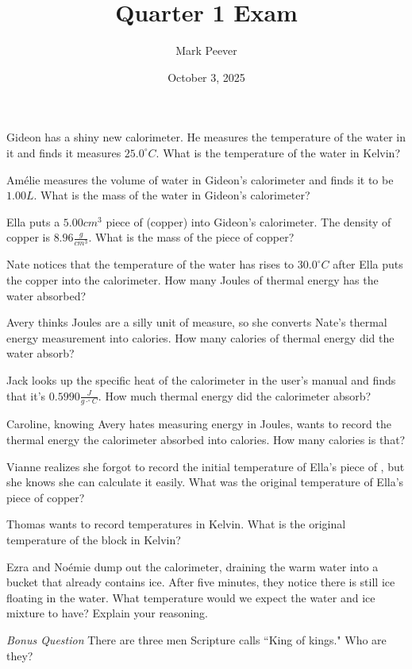 \documentclass[11pt,addpoints]{exam}   	%
\title{Quarter 1 Exam}
\author{Mark Peever}
\date{October 3, 2025}							%
\begin{document}
\maketitle

\pointsinrightmargin

\begin{center}
\end{center}
\vspace{0.1in}
\vspace{0.2in}

\begin{questions}
\question[5] Gideon has a shiny new calorimeter. He measures the temperature of the water in it and finds it measures  $25.0^{\circ}C$. What is the temperature of the water in Kelvin? 

\question[5] Am\'{e}lie measures the volume of water in Gideon's calorimeter and finds it to be $1.00 L$. What is the mass of the water in Gideon's calorimeter?

\question[5] Ella puts a $5.00 cm^3$ piece of  (copper) into Gideon's calorimeter.  The density of copper is $8.96 \frac{g}{cm^{3}}$. What is the mass of the piece of copper?

\question[5] Nate notices that the temperature of the water has rises to $30.0^{\circ}C$ after Ella puts the copper into the calorimeter. How many Joules of thermal energy has the water absorbed?

\question[5] Avery thinks Joules are a silly unit of measure, so she converts Nate's thermal energy measurement into calories. How many calories of thermal energy did the water absorb?

\question[5] Jack looks up the specific heat of the calorimeter in the user's manual and finds that it's $0.5990 \frac{J}{g \cdot ^{\circ}C}$. How much thermal energy did the calorimeter absorb?

\question[5] Caroline, knowing Avery hates measuring energy in Joules, wants to record the thermal energy the calorimeter absorbed into calories. How many calories is that?

\question[5] Vianne realizes she forgot to record the initial temperature of Ella's piece of , but she knows she can calculate it easily. What was the original temperature of Ella's piece of copper?

\question[5] Thomas wants to record temperatures in Kelvin. What is the original temperature of the  block in Kelvin?

\question[5] Ezra and No\'{e}mie dump out the calorimeter, draining the warm water into a bucket that already contains ice. After five minutes, they notice there is still ice floating in the water. What temperature would we expect the water and ice mixture to have? Explain your reasoning.

\bonusquestion \emph{Bonus Question} There are three men Scripture calls ``King of kings." Who are they?

\end{questions}
\end{document}
